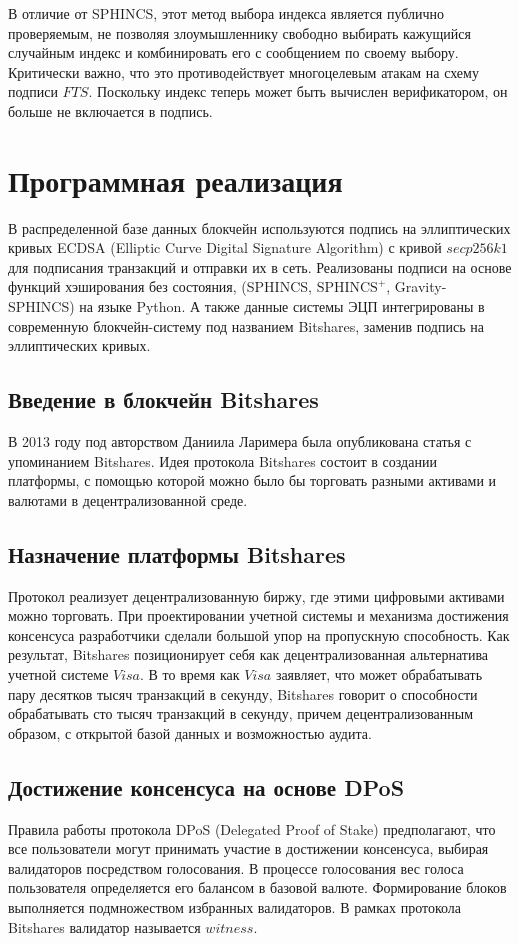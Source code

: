 \documentclass[a4paper, 14pt]{extarticle}
\begin{document}
В отличие от SPHINCS, этот метод выбора индекса является публично проверяемым, не позволяя злоумышленнику свободно выбирать кажущийся случайным индекс и комбинировать его с сообщением по своему выбору. Критически важно, что это противодействует многоцелевым атакам на схему подписи $FTS$. Поскольку индекс теперь может быть вычислен верификатором, он больше не включается в подпись.
\newpage

\section{Программная реализация}
В распределенной базе данных блокчейн используются подпись на эллиптических кривых ECDSA (Elliptic Curve Digital Signature Algorithm) с кривой $secp256k1$ для подписания транзакций и отправки их в сеть. Реализованы подписи на основе функций хэширования без состояния, (SPHINCS, $\text{SPHINCS}^{+}$, Gravity-SPHINCS) на языке Python. А также данные системы ЭЦП интегрированы в современную блокчейн-систему под названием Bitshares, заменив подпись на эллиптических кривых.

\subsection{Введение в блокчейн Bitshares}
В 2013 году под авторством Даниила Ларимера была опубликована статья с упоминанием Bitshares. Идея протокола Bitshares состоит в создании платформы, с помощью которой можно было бы торговать разными активами и валютами в децентрализованной среде.

\subsection{Назначение платформы Bitshares}
Протокол реализует децентрализованную биржу, где этими цифровыми активами можно торговать. При проектировании учетной системы и механизма достижения консенсуса разработчики сделали большой упор на пропускную способность. Как результат, Bitshares позиционирует себя как децентрализованная альтернатива учетной системе $Visa$. В то время как $Visa$ заявляет, что может обрабатывать пару десятков тысяч транзакций в секунду, Bitshares говорит о способности обрабатывать сто тысяч транзакций в секунду, причем децентрализованным образом, с открытой базой данных и возможностью аудита.

\subsection{Достижение консенсуса на основе DPoS}
Правила работы протокола DPoS (Delegated Proof of Stake) предполагают, что все пользователи могут принимать участие в достижении консенсуса, выбирая валидаторов посредством голосования. В процессе голосования вес голоса пользователя определяется его балансом в базовой валюте. Формирование блоков выполняется подмножеством избранных валидаторов. В рамках протокола Bitshares валидатор называется $witness$.
\end{document}

